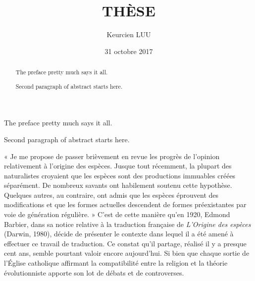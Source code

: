 \documentclass[12pt,twoside]{reedthesis}
\title{THÈSE}
\author{Keurcien LUU}
\date{31 octobre 2017}
\begin{document}
      \maketitle
  
  \frontmatter %
  \pagestyle{empty} %

      \begin{acknowledgements}
      The preface pretty much says it all. \par  Second paragraph of abstract
      starts here.
    \end{acknowledgements}
  
      \begin{preface}
      « Je me propose de passer brièvement en revue les progrès de l'opinion
      relativement à l'origine des espèces. Jusque tout récemment, la plupart
      des naturalistes croyaient que les espèces sont des productions
      immuables créées séparément. De nombreux savants ont habilement soutenu
      cette hypothèse. Quelques autres, au contraire, ont admis que les
      espèces éprouvent des modifications et que les formes actuelles
      descendent de formes préexistantes par voie de génération régulière. »
      C'est de cette manière qu'en 1920, Edmond Barbier, dans sa notice
      relative à la traduction française de \textit{L'Origine des espèces}
      (Darwin, 1980), décide de présenter le contexte dans lequel il a été
      amené à effectuer ce travail de traduction. Ce constat qu'il partage,
      réalisé il y a presque cent ans, semble pourtant valoir encore
      aujourd'hui. Si bien que chaque sortie de l'Église catholique affirmant
      la compatibilité entre la religion et la théorie évolutionniste apporte
      son lot de débats et de controverses. \par
    \end{preface}
  
      \hypersetup{linkcolor=black}
    \setcounter{tocdepth}{2}
    \tableofcontents
  
      \listoftables
  
      \listoffigures
  
      \begin{abstract}
      The preface pretty much says it all. \par  Second paragraph of abstract
      starts here.
    \end{abstract}
  
  
  \mainmatter %
  \pagestyle{fancyplain} %
\end{document}
